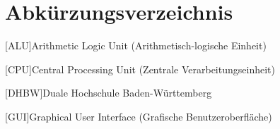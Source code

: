 
\chapter*{Abkürzungsverzeichnis}                  
\begin{acronym}[DHBW]

 [ALU]{Arithmetic Logic Unit (Arithmetisch-logische Einheit)}

 [CPU]{Central Processing Unit (Zentrale Verarbeitungseinheit)}

 [DHBW]{Duale Hochschule Baden-Württemberg}

 [GUI]{Graphical User Interface (Grafische Benutzeroberfläche)}

 


\end{acronym}
